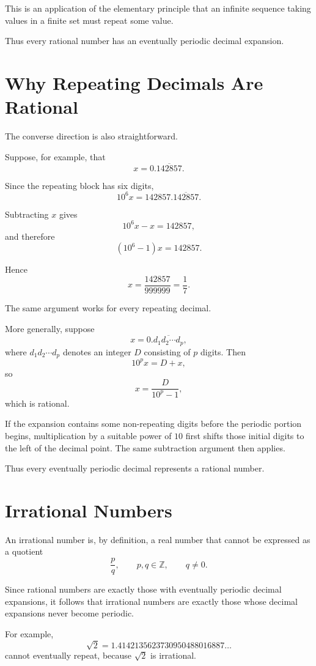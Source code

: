 \documentclass{essay}
\begin{document}
This is an application of the elementary principle that an infinite sequence taking values in a finite set must repeat some value.

Thus every rational number has an eventually periodic decimal expansion.

\section{Why Repeating Decimals Are Rational}

The converse direction is also straightforward.

Suppose, for example, that
\[ x=0.\overline{142857}. \]

Since the repeating block has six digits,
\[ 10^{6}x = 142857.\overline{142857}. \]

Subtracting \(x\) gives
\[ 10^{6}x-x = 142857, \]
and therefore
\[ (10^{6}-1)x = 142857. \]

Hence
\[ x = \frac{142857}{999999} = \frac{1}{7}. \]

The same argument works for every repeating decimal.

More generally, suppose
\[ x=0.\overline{d_{1}d_{2}\cdots d_{p}}, \]
where \(d_{1}d_{2}\cdots d_{p}\) denotes an integer \(D\) consisting of \(p\) digits. Then
\[ 10^{p} x=D+x, \]
so
\[ x=\frac{D}{10^{p}-1}, \]
which is rational.

If the expansion contains some non-repeating digits before the periodic portion begins, multiplication by a suitable power of \(10\) first shifts those initial digits to the left of the decimal point. The same subtraction argument then applies.

Thus every eventually periodic decimal represents a rational number.

\section{Irrational Numbers}

An irrational number is, by definition, a real number that cannot be expressed as a quotient
\[ \frac{p}{q}, \qquad p,q\in\mathbb{Z}, \qquad q\neq 0. \]

Since rational numbers are exactly those with eventually periodic decimal expansions, it follows that irrational numbers are exactly those whose decimal expansions never become periodic.

For example,
\[ \sqrt{2} = 1.4142135623730950488016887\ldots \]
cannot eventually repeat, because \(\sqrt{2}\) is irrational.
\end{document}
